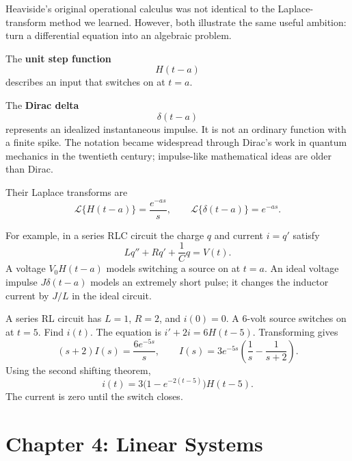 \documentclass[11pt,letterpaper]{article}
\begin{document}

Heaviside's original operational calculus was not
identical to the Laplace-transform method we learned.
However, both illustrate the same useful ambition:
turn a differential equation into an algebraic problem.

The \textbf{unit step function}
\[
H(t-a)
\]
describes an input that switches on at $t=a$.

The \textbf{Dirac delta}
\[
\delta(t-a)
\]
represents an idealized instantaneous impulse.
It is not an ordinary function with a finite spike.
The notation became widespread through Dirac's
work in quantum mechanics in the twentieth century;
impulse-like mathematical ideas are older than Dirac.


Their Laplace transforms are
\[
\mathcal{L}\{H(t-a)\}=\frac{e^{-as}}{s},
\qquad
\mathcal{L}\{\delta(t-a)\}=e^{-as}.
\]

For example, in a series RLC circuit the charge $q$
and current $i=q'$ satisfy
\[
Lq''+Rq'+\frac1Cq=V(t).
\]
A voltage $V_0H(t-a)$ models switching a source on
at $t=a$. An ideal voltage impulse $J\delta(t-a)$
models an extremely short pulse; it changes the
inductor current by $J/L$ in the ideal circuit.

\begin{example}{
A series RL circuit has $L=1$, $R=2$, and $i(0)=0$.
A 6-volt source switches on at $t=5$. Find $i(t)$.
}
The equation is $i'+2i=6H(t-5)$.
Transforming gives
\[
(s+2)I(s)=\frac{6e^{-5s}}s,\qquad
I(s)=3e^{-5s}\left(\frac1s-\frac1{s+2}\right).
\]
Using the second shifting theorem,
\[
\boxed{i(t)=3\bigl(1-e^{-2(t-5)}\bigr)H(t-5).}
\]
The current is zero until the switch closes.
\end{example}

\section{Chapter 4: Linear Systems}

\end{document}
